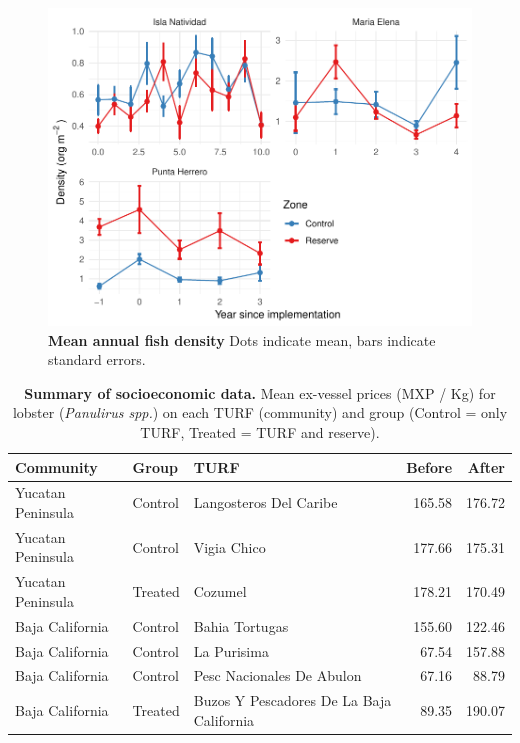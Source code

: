 \documentclass[10pt]{article}
\begin{document}
\clearpage

\begin{figure}[h]
\centering
\includegraphics{img/S4_fig.pdf}
\caption{{\bf Mean annual fish density} Dots indicate mean, bars indicate standard errors.}
\end{figure}

\clearpage

\begin{table}[h]
\caption{{\bf Summary of socioeconomic data.} Mean ex-vessel prices (MXP / Kg) for lobster (\emph{Panulirus spp.}) on each TURF (community) and group (Control = only TURF, Treated = TURF and reserve).}
\centering
\begin{tabular}{lllrr}
\toprule
Community & Group & TURF & Before & After\\
\midrule
Yucatan Peninsula & Control & Langosteros Del Caribe & 165.58 & 176.72\\
Yucatan Peninsula & Control & Vigia Chico & 177.66 & 175.31\\
Yucatan Peninsula & Treated & Cozumel & 178.21 & 170.49\\
Baja California & Control & Bahia Tortugas & 155.60 & 122.46\\
Baja California & Control & La Purisima & 67.54 & 157.88\\
Baja California & Control & Pesc Nacionales De Abulon & 67.16 & 88.79\\
Baja California & Treated & Buzos Y Pescadores De La Baja California & 89.35 & 190.07\\
\bottomrule
\end{tabular}
\end{table}
\end{document}
